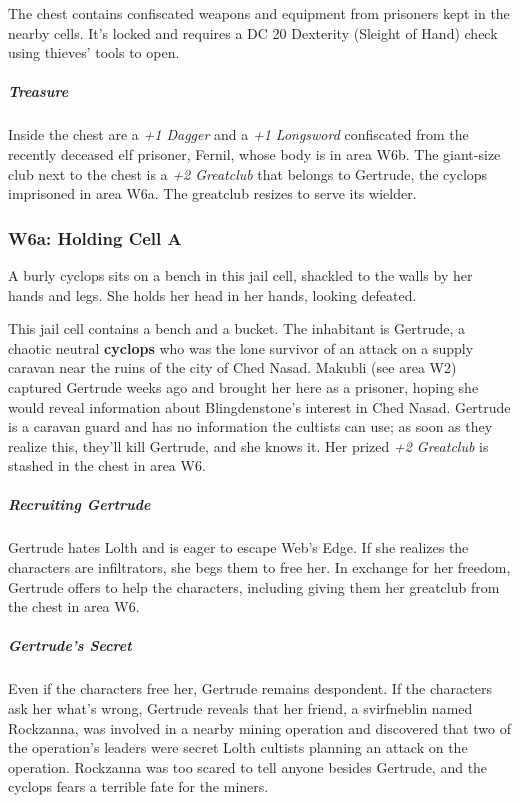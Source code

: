 \documentclass[10pt,a4paper,twoside,bg=print,twocolumn,openany,nodeprecatedcode]{dndbook}
\begin{document}
The chest contains confiscated weapons and equipment from prisoners kept in the nearby cells. It's locked and requires a DC 20 Dexterity (Sleight of Hand) check using thieves' tools to open.

\subparagraph{Treasure}
Inside the chest are a \textit{+1 Dagger} and a \textit{+1 Longsword} confiscated from the recently deceased elf prisoner, Fernil, whose body is in area W6b. The giant-size club next to the chest is a \textit{+2 Greatclub} that belongs to Gertrude, the cyclops imprisoned in area W6a. The greatclub resizes to serve its wielder.

\subsubsection{W6a: Holding Cell A}
\begin{DndReadAloud}{}
A burly cyclops sits on a bench in this jail cell, shackled to the walls by her hands and legs. She holds her head in her hands, looking defeated.

\end{DndReadAloud}

This jail cell contains a bench and a bucket. The inhabitant is Gertrude, a chaotic neutral \textbf{cyclops} who was the lone survivor of an attack on a supply caravan near the ruins of the city of Ched Nasad. Makubli (see area W2) captured Gertrude weeks ago and brought her here as a prisoner, hoping she would reveal information about Blingdenstone's interest in Ched Nasad. Gertrude is a caravan guard and has no information the cultists can use; as soon as they realize this, they'll kill Gertrude, and she knows it. Her prized \textit{+2 Greatclub} is stashed in the chest in area W6.

\subparagraph{Recruiting Gertrude}
Gertrude hates Lolth and is eager to escape Web's Edge. If she realizes the characters are infiltrators, she begs them to free her. In exchange for her freedom, Gertrude offers to help the characters, including giving them her greatclub from the chest in area W6.

\subparagraph{Gertrude's Secret}
Even if the characters free her, Gertrude remains despondent. If the characters ask her what's wrong, Gertrude reveals that her friend, a svirfneblin named Rockzanna, was involved in a nearby mining operation and discovered that two of the operation's leaders were secret Lolth cultists planning an attack on the operation. Rockzanna was too scared to tell anyone besides Gertrude, and the cyclops fears a terrible fate for the miners.
\end{document}
